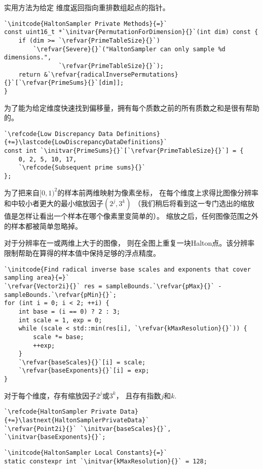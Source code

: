 实用方法为给定
维度返回指向重排数组起点的指针。
\begin{lstlisting}
`\initcode{HaltonSampler Private Methods}{=}`
const uint16_t *`\initvar{PermutationForDimension}{}`(int dim) const {
    if (dim >= `\refvar{PrimeTableSize}{}`)
        `\refvar{Severe}{}`("HaltonSampler can only sample %d dimensions.",
               `\refvar{PrimeTableSize}{}`);
    return &`\refvar{radicalInversePermutations}{}`[`\refvar{PrimeSums}{}`[dim]];
}
\end{lstlisting}

为了能为给定维度快速找到偏移量，拥有每个质数之前的所有质数之和是很有帮助的。
\begin{lstlisting}
`\refcode{Low Discrepancy Data Definitions}{+=}\lastcode{LowDiscrepancyDataDefinitions}`
const int `\initvar{PrimeSums}{}`[`\refvar{PrimeTableSize}{}`] = {
    0, 2, 5, 10, 17, 
    `\refcode{Subsequent prime sums}{}`
};
\end{lstlisting}

为了把来自$[0,1)^2$的样本前两维映射为像素坐标，
在每个维度上求得比图像分辨率
和中较小者更大的最小缩放因子$(2^j,3^k)$
（我们稍后将看到这一专门选出的缩放值是怎样让看出一个样本在哪个像素里变简单的）。
缩放之后，任何图像范围之外的样本都被简单忽略掉。

对于分辨率在一或两维上大于的图像，
则在全图上重复一块Halton点。该分辨率限制帮助在算得的样本值中保持足够的浮点精度。
\begin{lstlisting}
`\initcode{Find radical inverse base scales and exponents that cover sampling area}{=}`
`\refvar{Vector2i}{}` res = sampleBounds.`\refvar{pMax}{}` - sampleBounds.`\refvar{pMin}{}`;
for (int i = 0; i < 2; ++i) {
    int base = (i == 0) ? 2 : 3;
    int scale = 1, exp = 0;
    while (scale < std::min(res[i], `\refvar{kMaxResolution}{}`)) {
        scale *= base;
        ++exp;
    }
    `\refvar{baseScales}{}`[i] = scale;
    `\refvar{baseExponents}{}`[i] = exp;
}
\end{lstlisting}

对于每个维度，存有缩放因子$2^j$或$3^k$，
且存有指数$j$和$k$.
\begin{lstlisting}
`\refcode{HaltonSampler Private Data}{+=}\lastnext{HaltonSamplerPrivateData}`
`\refvar{Point2i}{}` `\initvar{baseScales}{}`, `\initvar{baseExponents}{}`;
\end{lstlisting}
\begin{lstlisting}
`\initcode{HaltonSampler Local Constants}{=}`
static constexpr int `\initvar{kMaxResolution}{}` = 128;
\end{lstlisting}

